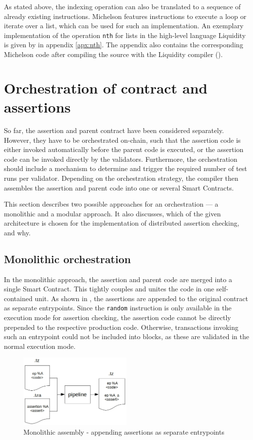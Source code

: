 As stated above, the indexing operation can also be translated to a sequence of already existing instructions. Michelson features instructions to execute a loop or iterate over a list, which can be used for such an implementation. An exemplary implementation of the operation \texttt{nth} for lists in the high-level language Liquidity is given by  in appendix \ref{apx:nth}. The appendix also contains the corresponding Michelson code after compiling the source with the Liquidity compiler ().

\section{Orchestration of contract and assertions}\label{sec:orchestration}
So far, the assertion and parent contract have been considered separately. However, they have to be orchestrated on-chain, such that the assertion code is either invoked automatically before the parent code is executed, or the assertion code can be invoked directly by the validators. Furthermore, the orchestration should include a mechanism to determine and trigger the required number of test runs per validator. Depending on the orchestration strategy, the compiler then assembles the assertion and parent code into one or several Smart Contracts.

This section describes two possible approaches for an orchestration --- a monolithic and a modular approach. It also discusses, which of the given architecture is chosen for the implementation of distributed assertion checking, and why.

\subsection{Monolithic orchestration}\label{sec:monolithic}
In the monolithic approach, the assertion and parent code are merged into a single Smart Contract. This tightly couples and unites the code in one self-contained unit. As shown in , the assertions are appended to the original contract as separate entrypoints. Since the \texttt{random} instruction is only available in the execution mode for assertion checking, the assertion code cannot be directly prepended to the respective production code. Otherwise, transactions invoking such an entrypoint could not be included into blocks, as these are validated in the normal execution mode.
\begin{figure}[h]
\centering
  \includegraphics[width=0.5\textwidth]{figures/5-offline_tezos/pipeline_output_mono_ep_basic.jpg}
	\caption{Monolithic assembly - appending assertions as separate entrypoints}
	\label{fig:mono_eps}
\end{figure}

